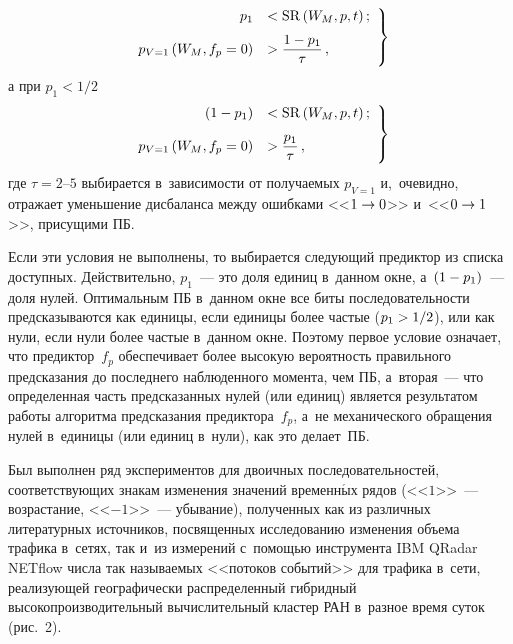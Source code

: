 \begin{multicols}{2}
\noindent
  \begin{equation}
  \left.
  \begin{array}{rl}
  p_1 &< \mathrm{SR}\left( W_M, p, t\right);\\[6pt]
  p_{V=1}\left( W_M, f_p = 
0\right)& > \displaystyle\frac{\displaystyle 1-p_1\mathstrut}{\displaystyle \tau\mathstrut}\,,
\end{array}
\right\}
  \label{e4-fr}
  \end{equation}
а при $p_1<1/2$
\begin{equation}
\left.
\begin{array}{rl}
  (1-p_1) &< \mathrm{SR}\left( W_M, p, t\right);\\[6pt]
  p_{V=1}\left( W_M, f_p = 
0\right) &> \displaystyle\frac{\displaystyle p_1\mathstrut}{\displaystyle \tau\mathstrut}\,,
\end{array}
\right\}
  \label{e5-fr}
  \end{equation}
где $\tau=2\mbox{--}5$ выбирается в~зависимости от получаемых $p_{V=1}$ 
и,~очевидно, отражает уменьшение дисбаланса между ошибками 
<<$1\hm\to0$>> и~<<$0\hm\to1$>>, присущими ПБ.
  
  Если эти условия не выполнены, то выбирается следующий предиктор из 
списка доступных. Действительно, $p_1$~--- это доля единиц в~данном окне, 
а~$(1\hm- p_1)$~--- доля нулей. Оптимальным ПБ 
в~данном окне все биты последовательности предсказываются как единицы, 
если единицы более час\-тые ($p_1\hm >1/2$), или как нули, если нули более 
частые в~данном окне. Поэтому первое условие означает, что 
предиктор~$f_p$ обеспечивает более высокую вероятность правильного 
предсказания до последнего наблюденного момента, чем ПБ, а~вторая~--- 
что определенная часть предсказанных нулей (или единиц) является 
результатом работы алгоритма предсказания предиктора~$f_p$, а~не 
механического обращения нулей в~единицы (или единиц в~нули), как это 
делает~ПБ.
   
  Был выполнен ряд экспериментов для двоичных последовательностей, 
соответствующих знакам изменения значений временн$\acute{\mbox{ы}}$х рядов (<<$1$>>~--- 
воз\-рас\-та\-ние, <<$-1$>>~--- убывание), полученных как из различных 
литературных источников, посвященных исследованию изменения объема 
трафика в~сетях, так и~из измерений с~помощью инструмента IBM QRadar 
NETflow числа так называемых <<потоков событий>> для трафика в~сети, 
реализующей географически распределенный гибридный 
высокопроизводительный вычислительный кластер РАН в~разное время 
суток~\cite{16-fr} (рис.~2).
   
  \begin{figure*} %
\vspace*{1pt}
 \begin{center}
 \mbox{%
 \epsfxsize=102.531mm 
 }
 \end{center}
   \vspace*{-6pt}
\vspace*{9pt}
\end{figure*}


\end{multicols}

